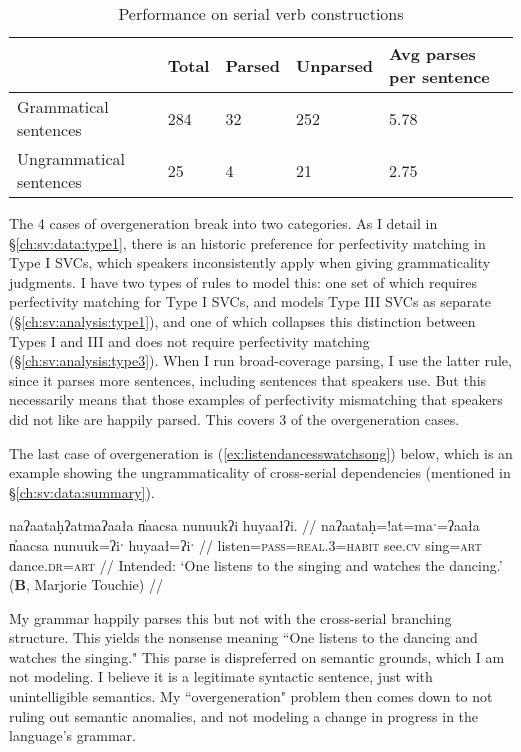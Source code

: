 \begin{table}[H]
\centering
\caption{Performance on serial verb constructions}
\label{table:svc-coverage}
\begin{tabular}{l|llll}
 & Total & Parsed & Unparsed & Avg parses per sentence \\ \hline
Grammatical sentences & 284 & 32 & 252 & 5.78 \\ \hline
Ungrammatical sentences & 25 & 4 & 21 & 2.75
\end{tabular}
\end{table}

The 4 cases of overgeneration break into two categories. As I detail in \S\ref{ch:sv:data:type1}, there is an historic preference for perfectivity matching in Type I SVCs, which speakers inconsistently apply when giving grammaticality judgments. I have two types of rules to model this: one set of which requires perfectivity matching for Type I SVCs, and models Type III SVCs as separate (\S\ref{ch:sv:analysis:type1}), and one of which collapses this distinction between Types I and III and does not require perfectivity matching (\S\ref{ch:sv:analysis:type3}). When I run broad-coverage parsing, I use the latter rule, since it parses more sentences, including sentences that speakers use. But this necessarily means that those examples of perfectivity mismatching that speakers did not like are happily parsed. This covers 3 of the overgeneration cases.

The last case of overgeneration is (\ref{ex:listendancesswatchsong}) below, which is an example showing the ungrammaticality of cross-serial dependencies (mentioned in \S\ref{ch:sv:data:summary}).

\ex \label{ex:listendancesswatchsong}
\begingl
\glpreamble *naʔaataḥʔatmaʔaała n̓aacsa nunuukʔi huyaałʔi. //
\gla naʔaataḥ=!at=maˑ=ʔaała n̓aacsa nunuuk=ʔiˑ huyaał=ʔiˑ //
\glb listen=\textsc{pass}=\textsc{real.3}=\textsc{habit} see.\textsc{cv} sing=\textsc{art} dance.\textsc{dr}=\textsc{art} //
\glft Intended: `One listens to the singing and watches the dancing.' (\textbf{B}, Marjorie Touchie) //
\endgl
\xe

My grammar happily parses this but not with the cross-serial branching structure. This yields the nonsense meaning ``One listens to the dancing and watches the singing." This parse is dispreferred on semantic grounds, which I am not modeling. I believe it is a legitimate syntactic sentence, just with unintelligible semantics. My ``overgeneration" problem then comes down to not ruling out semantic anomalies, and not modeling a change in progress in the language's grammar.

